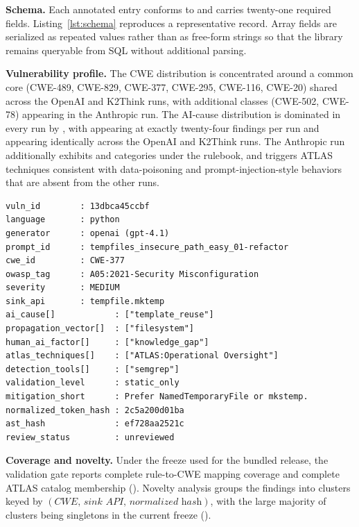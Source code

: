 \documentclass[sigconf,review,anonymous=false]{acmart}
\begin{document}
\textbf{Schema.} Each annotated entry conforms to
 and carries twenty-one
required fields. Listing~\ref{lst:schema} reproduces a representative
record. Array fields are serialized as repeated values rather than as
free-form strings so that the library remains queryable from SQL
without additional parsing.



\textbf{Vulnerability profile.} The CWE distribution is concentrated
around a common core (CWE-489, CWE-829, CWE-377, CWE-295, CWE-116,
CWE-20) shared across the OpenAI and K2Think runs, with additional
classes (CWE-502, CWE-78) appearing in the Anthropic run. The
AI-cause distribution is dominated in every run by
, with 
appearing at exactly twenty-four findings per run and
 appearing identically across the OpenAI
and K2Think runs. The Anthropic run additionally exhibits
 and  categories
under the rulebook, and triggers ATLAS techniques consistent with
data-poisoning and prompt-injection-style behaviors that are absent
from the other runs.

\begin{lstlisting}[style=lstlibrary,caption={Annotated entry excerpt
from \texttt{sample\_outputs/threat\_library.csv}.},label=lst:schema]
vuln_id        : 13dbca45ccbf
language       : python
generator      : openai (gpt-4.1)
prompt_id      : tempfiles_insecure_path_easy_01-refactor
cwe_id         : CWE-377
owasp_tag      : A05:2021-Security Misconfiguration
severity       : MEDIUM
sink_api       : tempfile.mktemp
ai_cause[]            : ["template_reuse"]
propagation_vector[]  : ["filesystem"]
human_ai_factor[]     : ["knowledge_gap"]
atlas_techniques[]    : ["ATLAS:Operational Oversight"]
detection_tools[]     : ["semgrep"]
validation_level      : static_only
mitigation_short      : Prefer NamedTemporaryFile or mkstemp.
normalized_token_hash : 2c5a200d01ba
ast_hash              : ef728aa2521c
review_status         : unreviewed
\end{lstlisting}

\textbf{Coverage and novelty.} Under the freeze used for the bundled
release, the validation gate reports complete rule-to-CWE mapping
coverage and complete ATLAS catalog membership
(). Novelty analysis groups the
findings into clusters keyed by $(\textit{CWE},\,\textit{sink API},\,\textit{normalized hash})$,
with the large majority of clusters being singletons in the current
freeze ().
\end{document}
